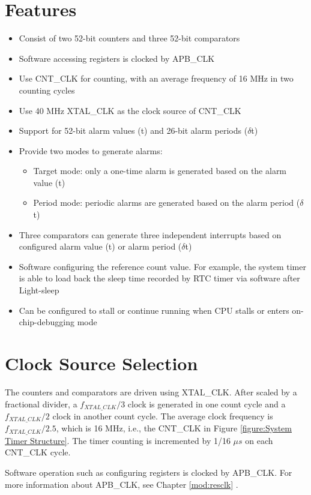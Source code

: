 \documentclass[main\_\_EN.tex]{subfiles}
\begin{document}
\section{Features}
\begin{itemize}
    \item Consist of two 52-bit counters and three 52-bit comparators
    \item Software accessing registers is clocked by APB\_CLK
    \item Use CNT\_CLK for counting, with an average frequency of 16 MHz in two counting cycles
    \item Use 40 MHz XTAL\_CLK as the clock source of CNT\_CLK
    \item Support for 52-bit alarm values (t) and 26-bit alarm periods ($\delta$t)
    \item Provide two modes to generate alarms:
    \begin{itemize}
        \item Target mode: only a one-time alarm is generated based on the alarm value (t)
        \item Period mode: periodic alarms are generated based on the alarm period ($\delta$t)
    \end{itemize}
    \item Three comparators can generate three independent interrupts based on configured alarm value (t) or alarm period ($\delta$t)
    \item Software configuring the reference count value. For example, the system timer is able to load back the sleep time recorded by RTC timer via software after Light-sleep
    \item Can be configured to stall or continue running when CPU stalls or enters on-chip-debugging mode
\end{itemize}

\section{Clock Source Selection}
The counters and comparators are driven using XTAL\_CLK. After scaled by a fractional divider, a $f_{XTAL\_CLK}/3$ clock is generated in one count cycle and a $f_{XTAL\_CLK}/2$ clock in another count cycle. The average clock frequency is $f_{XTAL\_CLK}/2.5$, which is 16 MHz, i.e., the CNT\_CLK in Figure \ref{figure:System Timer Structure}. The timer counting is incremented by 1/16 $\mu s$ on each CNT\_CLK cycle.

Software operation such as configuring registers is clocked by APB\_CLK. For more information about APB\_CLK, see Chapter \ref{mod:resclk} \textit{}.
\end{document}
